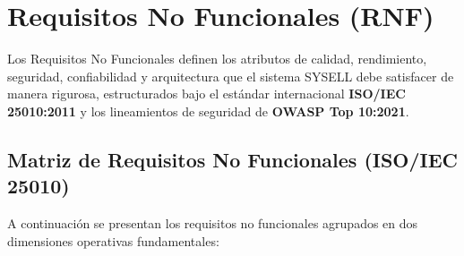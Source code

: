 
\section{Requisitos No Funcionales (RNF)}

Los Requisitos No Funcionales definen los atributos de calidad, rendimiento, seguridad, confiabilidad y arquitectura que el sistema SYSELL debe satisfacer de manera rigurosa, estructurados bajo el estándar internacional \textbf{ISO/IEC 25010:2011} y los lineamientos de seguridad de \textbf{OWASP Top 10:2021}.

\subsection{Matriz de Requisitos No Funcionales (ISO/IEC 25010)}

A continuación se presentan los requisitos no funcionales agrupados en dos dimensiones operativas fundamentales:

